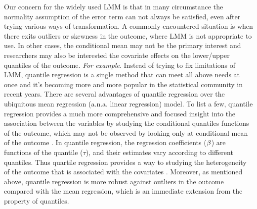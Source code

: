 \documentclass{article}
\begin{document}
Our concern for the widely used LMM is that in many circumstance the normality assumption of the error term can not always be satisfied, even after trying various ways of transformation. A commonly encountered situation is when there exits outliers or skewness in the outcome, where LMM is not appropriate to use. In other cases, the conditional mean may not be the primary interest and researchers may also be interested the covariate effects on the lower/upper quantiles of the outcome. \emph{For example}. Instead of trying to fix limitations of LMM, quantile regression is a single method that can meet all above needs at once and it's becoming more and more popular in the statistical community in recent years. There are several advantages of quantile regression over the ubiquitous mean regression (a.n.a. linear regression) model. To list a few, quantile regression provides a much more comprehensive and focused insight into the association between the variables by studying the conditional quantiles functions of the outcome,  which may not be observed by looking only at conditional mean of the outcome \citep{koenker2005quantile}. In quantile regression, the regression coefficients (${\bf \beta}$) are functions of the quantile ($\tau$), and their estimates vary according to different quantiles. Thus quartile regression provides a way to studying the heterogeneity of the outcome that is associated with the covariates \citep{koenker2005quantile}. Moreover, as mentioned above, quantile regression is more robust against outliers in the outcome compared with the mean regression, which is an immediate extension from the property of quantiles. \par
\end{document}
